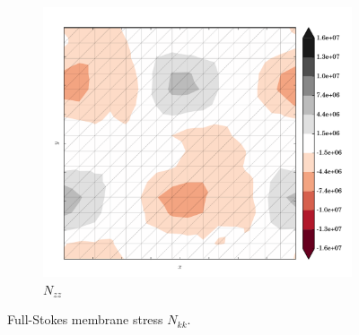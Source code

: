 \begin{figure}
  \begin{subfigure}[b]{0.3\linewidth}
    \includegraphics[width=\linewidth]{images/stress_balance/FS/N_zz.pdf}
  \caption{$N_{zz}$}
  \label{fs_N_zz}
  \end{subfigure}
 
  \caption[ISMIP-HOM full-Stokes membrane stress]{Full-Stokes membrane stress $N_{kk}$.}

  \label{fs_membrane_stress}

\end{figure}


